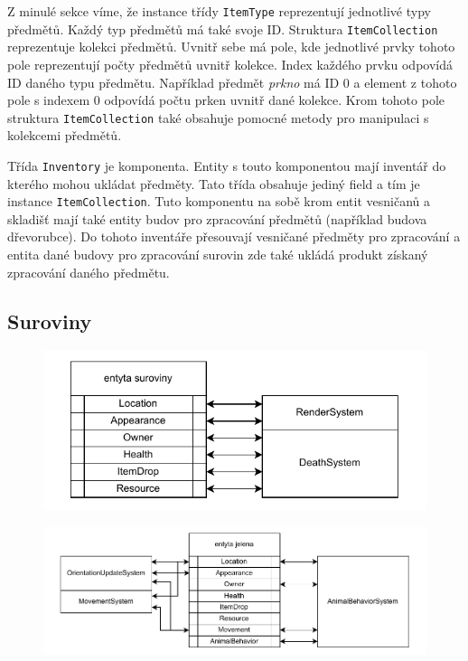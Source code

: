 Z minulé sekce víme, že instance třídy \texttt{ItemType} reprezentují jednotlivé typy předmětů. Každý typ předmětů má také svoje ID. Struktura \texttt{ItemCollection} reprezentuje kolekci předmětů. Uvnitř sebe má pole, kde jednotlivé prvky tohoto pole reprezentují počty předmětů uvnitř kolekce. Index každého prvku odpovídá ID daného typu předmětu. Například předmět \textit{prkno} má ID 0 a element z tohoto pole s indexem 0 odpovídá počtu prken uvnitř dané kolekce. Krom tohoto pole struktura \texttt{ItemCollection} také obsahuje pomocné metody pro manipulaci s kolekcemi předmětů.

Třída \texttt{Inventory} je komponenta. Entity s touto komponentou mají inventář do kterého mohou ukládat předměty. Tato třída obsahuje jediný field a tím je instance \texttt{ItemCollection}. Tuto komponentu na sobě krom entit vesničanů a skladišť mají také entity budov pro zpracování předmětů (například budova dřevorubce). Do tohoto inventáře přesouvají vesničané předměty pro zpracování a entita dané budovy pro zpracování surovin zde také ukládá produkt získaný zpracování daného předmětu.

\subsection{Suroviny}

\begin{figure}[!htb]
  \centering
  \includegraphics[width=0.8\linewidth]{img/resource.pdf}
  \caption{}
  \label{fig:resource}
\end{figure}

\begin{figure}[!htb]
  \centering
  \includegraphics[width=0.8\linewidth]{img/deer.pdf}
  \caption{}
  \label{fig:deer}
\end{figure}

